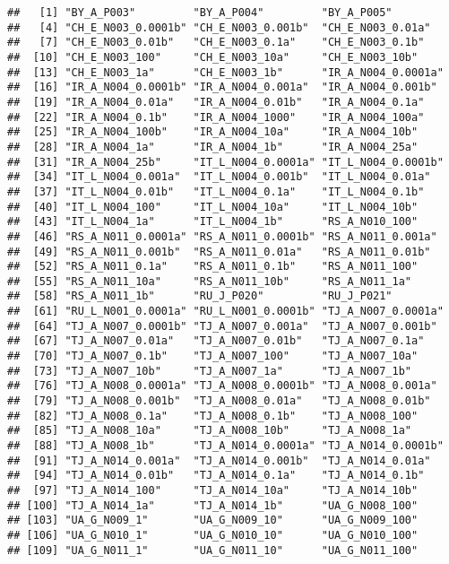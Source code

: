 \documentclass[table]{article}
\begin{document}
\begin{verbatim}
##   [1] "BY_A_P003"         "BY_A_P004"         "BY_A_P005"        
##   [4] "CH_E_N003_0.0001b" "CH_E_N003_0.001b"  "CH_E_N003_0.01a"  
##   [7] "CH_E_N003_0.01b"   "CH_E_N003_0.1a"    "CH_E_N003_0.1b"   
##  [10] "CH_E_N003_100"     "CH_E_N003_10a"     "CH_E_N003_10b"    
##  [13] "CH_E_N003_1a"      "CH_E_N003_1b"      "IR_A_N004_0.0001a"
##  [16] "IR_A_N004_0.0001b" "IR_A_N004_0.001a"  "IR_A_N004_0.001b" 
##  [19] "IR_A_N004_0.01a"   "IR_A_N004_0.01b"   "IR_A_N004_0.1a"   
##  [22] "IR_A_N004_0.1b"    "IR_A_N004_1000"    "IR_A_N004_100a"   
##  [25] "IR_A_N004_100b"    "IR_A_N004_10a"     "IR_A_N004_10b"    
##  [28] "IR_A_N004_1a"      "IR_A_N004_1b"      "IR_A_N004_25a"    
##  [31] "IR_A_N004_25b"     "IT_L_N004_0.0001a" "IT_L_N004_0.0001b"
##  [34] "IT_L_N004_0.001a"  "IT_L_N004_0.001b"  "IT_L_N004_0.01a"  
##  [37] "IT_L_N004_0.01b"   "IT_L_N004_0.1a"    "IT_L_N004_0.1b"   
##  [40] "IT_L_N004_100"     "IT_L_N004_10a"     "IT_L_N004_10b"    
##  [43] "IT_L_N004_1a"      "IT_L_N004_1b"      "RS_A_N010_100"    
##  [46] "RS_A_N011_0.0001a" "RS_A_N011_0.0001b" "RS_A_N011_0.001a" 
##  [49] "RS_A_N011_0.001b"  "RS_A_N011_0.01a"   "RS_A_N011_0.01b"  
##  [52] "RS_A_N011_0.1a"    "RS_A_N011_0.1b"    "RS_A_N011_100"    
##  [55] "RS_A_N011_10a"     "RS_A_N011_10b"     "RS_A_N011_1a"     
##  [58] "RS_A_N011_1b"      "RU_J_P020"         "RU_J_P021"        
##  [61] "RU_L_N001_0.0001a" "RU_L_N001_0.0001b" "TJ_A_N007_0.0001a"
##  [64] "TJ_A_N007_0.0001b" "TJ_A_N007_0.001a"  "TJ_A_N007_0.001b" 
##  [67] "TJ_A_N007_0.01a"   "TJ_A_N007_0.01b"   "TJ_A_N007_0.1a"   
##  [70] "TJ_A_N007_0.1b"    "TJ_A_N007_100"     "TJ_A_N007_10a"    
##  [73] "TJ_A_N007_10b"     "TJ_A_N007_1a"      "TJ_A_N007_1b"     
##  [76] "TJ_A_N008_0.0001a" "TJ_A_N008_0.0001b" "TJ_A_N008_0.001a" 
##  [79] "TJ_A_N008_0.001b"  "TJ_A_N008_0.01a"   "TJ_A_N008_0.01b"  
##  [82] "TJ_A_N008_0.1a"    "TJ_A_N008_0.1b"    "TJ_A_N008_100"    
##  [85] "TJ_A_N008_10a"     "TJ_A_N008_10b"     "TJ_A_N008_1a"     
##  [88] "TJ_A_N008_1b"      "TJ_A_N014_0.0001a" "TJ_A_N014_0.0001b"
##  [91] "TJ_A_N014_0.001a"  "TJ_A_N014_0.001b"  "TJ_A_N014_0.01a"  
##  [94] "TJ_A_N014_0.01b"   "TJ_A_N014_0.1a"    "TJ_A_N014_0.1b"   
##  [97] "TJ_A_N014_100"     "TJ_A_N014_10a"     "TJ_A_N014_10b"    
## [100] "TJ_A_N014_1a"      "TJ_A_N014_1b"      "UA_G_N008_100"    
## [103] "UA_G_N009_1"       "UA_G_N009_10"      "UA_G_N009_100"    
## [106] "UA_G_N010_1"       "UA_G_N010_10"      "UA_G_N010_100"    
## [109] "UA_G_N011_1"       "UA_G_N011_10"      "UA_G_N011_100"    

\end{verbatim}
\end{document}
